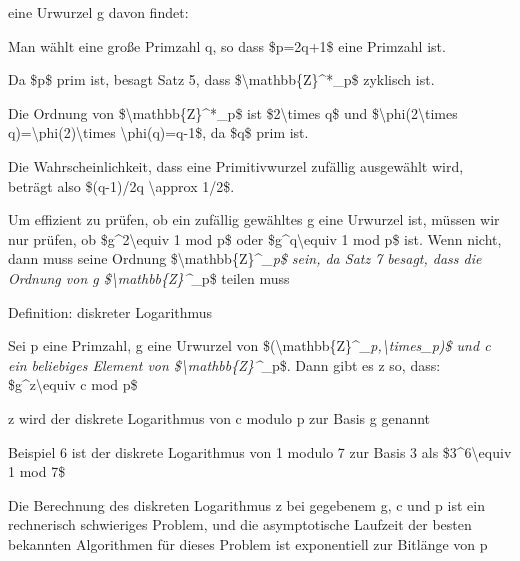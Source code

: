 \documentclass[a4paper]{article}
\begin{document}
\begin{multicols}{3}
\begin{itemize*}
            eine Urwurzel g davon findet:
            \begin{itemize*}
                  \item Man wählt eine große Primzahl q, so dass \$p=2q+1\$ eine Primzahl ist.
                  \begin{itemize*} \item Da \$p\$ prim ist, besagt Satz 5, dass \$\textbackslash mathbb\{Z\}\^{}*\_p\$ zyklisch ist. \item Die Ordnung von \$\textbackslash mathbb\{Z\}\^{}*\_p\$ ist \$2\textbackslash times q\$ und \$\textbackslash phi(2\textbackslash times q)=\textbackslash phi(2)\textbackslash times \textbackslash phi(q)=q-1\$, da \$q\$ prim ist. \item Die Wahrscheinlichkeit, dass eine Primitivwurzel zufällig ausgewählt wird, beträgt also \$(q-1)/2q \textbackslash approx 1/2\$. \item Um effizient zu prüfen, ob ein zufällig gewähltes g eine Urwurzel ist, müssen wir nur prüfen, ob \$g\^{}2\textbackslash equiv 1 mod p\$ oder \$g\^{}q\textbackslash equiv 1 mod p\$ ist. Wenn nicht, dann muss seine Ordnung \$\textbar\textbackslash mathbb\{Z\}\^{}\emph{\_p\textbar\$ sein, da Satz 7 besagt, dass die Ordnung von g \$\textbar\textbackslash mathbb\{Z\}\^{}}\_p\textbar\$ teilen muss \end{itemize*}
            \end{itemize*}
            \item Definition: diskreter Logarithmus
            \begin{itemize*}
                  \item Sei p eine Primzahl, g eine Urwurzel von \$(\textbackslash mathbb\{Z\}\^{}\emph{\_p,\textbackslash times\_p)\$ und c ein beliebiges Element von \$\textbackslash mathbb\{Z\}\^{}}\_p\$. Dann gibt es z so, dass: \$g\^{}z\textbackslash equiv c mod p\$
                  \item z wird der diskrete Logarithmus von c modulo p zur Basis g genannt
                  \item Beispiel 6 ist der diskrete Logarithmus von 1 modulo 7 zur Basis 3 als \$3\^{}6\textbackslash equiv 1 mod 7\$
                  \item Die Berechnung des diskreten Logarithmus z bei gegebenem g, c und p ist ein rechnerisch schwieriges Problem, und die asymptotische Laufzeit der besten bekannten Algorithmen für dieses Problem ist exponentiell zur Bitlänge von p
            \end{itemize*}
      \end{itemize*}



\end{multicols}
\end{document}
